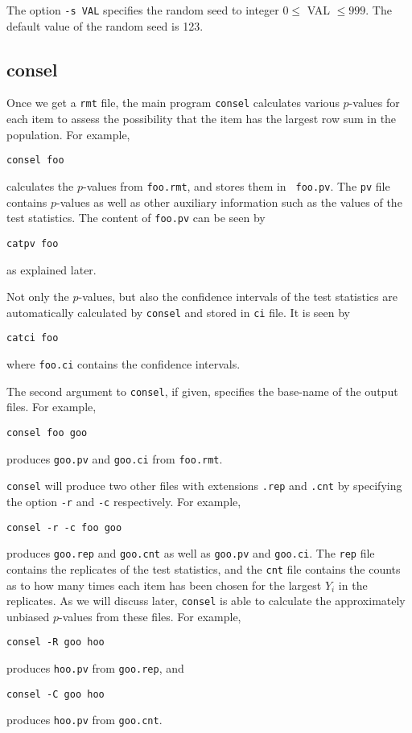 \documentclass[12pt]{article}
\begin{document}
The option {\tt -s VAL} specifies the random seed to integer $0\le$ VAL
$\le999$. The default value of the random seed is 123.



\subsection{consel}

Once we get a {\tt rmt} file, the main program {\tt consel} calculates
various $p$-values for each item to assess the possibility that the item
has the largest row sum in the population. For example,
\begin{verbatim}
consel foo
\end{verbatim}
calculates the $p$-values from {\tt foo.rmt}, and stores them in {\tt
foo.pv}. The {\tt pv} file contains $p$-values as well as other
auxiliary information such as the values of the test statistics.  The
content of {\tt foo.pv} can be seen by
\begin{verbatim}
catpv foo
\end{verbatim}
as explained later.

Not only the $p$-values, but also the confidence intervals of the test
statistics are automatically calculated by {\tt consel} and stored in
{\tt ci} file. It is seen by
\begin{verbatim}
catci foo
\end{verbatim}
where {\tt foo.ci} contains the confidence intervals.

The second argument to {\tt consel}, if given, specifies the base-name
of the output files. For example,
\begin{verbatim}
consel foo goo
\end{verbatim}
produces {\tt goo.pv} and {\tt goo.ci} from {\tt foo.rmt}.

{\tt consel} will produce two other files with extensions {\tt .rep} and
{\tt .cnt} by specifying the option {\tt -r} and {\tt -c}
respectively. For example,
\begin{verbatim}
consel -r -c foo goo
\end{verbatim}
produces {\tt goo.rep} and {\tt goo.cnt} as well as {\tt goo.pv} and
{\tt goo.ci}. The {\tt rep} file contains the replicates of the test
statistics, and the {\tt cnt} file contains the counts as to how many
times each item has been chosen for the largest $Y_i$ in the
replicates. As we will discuss
later, {\tt consel} is able to calculate the approximately unbiased
$p$-values from these files. For example,
\begin{verbatim}
consel -R goo hoo
\end{verbatim}
produces {\tt hoo.pv} from {\tt goo.rep}, and
\begin{verbatim}
consel -C goo hoo
\end{verbatim}
produces {\tt hoo.pv} from {\tt goo.cnt}.  
\end{document}
